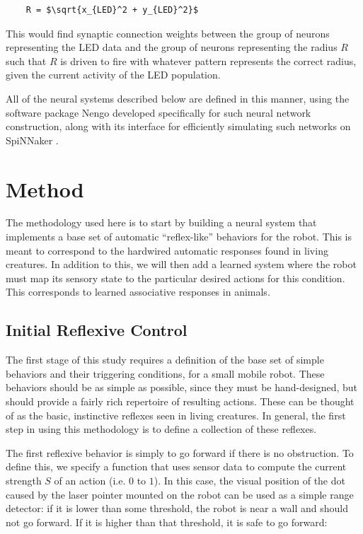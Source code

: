 \documentclass[conference]{IEEEtran}
\begin{document}
\begin{lstlisting}
    R = $\sqrt{x_{LED}^2 + y_{LED}^2}$
\end{lstlisting}

This would find synaptic connection weights between the group of neurons 
representing the LED data and the group of neurons representing the 
radius $R$ such that $R$ is driven to fire with whatever pattern represents 
the correct radius, given the current activity of the LED population. 

All of the neural systems described below are defined in this manner, using
the software package Nengo \cite{bekolay_nengo2014} developed specifically
for such neural network construction, along with its interface
for efficiently simulating such networks on SpiNNaker \cite{mundy2015}.

\section{Method}

The methodology used here is to start by building a neural system that
implements a base set of automatic ``reflex-like'' behaviors for the robot.
This is meant to correspond to the hardwired automatic responses found in
living creatures.  In addition to this, we will then add a learned system
where the robot must map its sensory state to the particular desired actions
for this condition.  This corresponds to learned associative responses
in animals.

\subsection{Initial Reflexive Control}
The first stage of this study requires a definition of the base set of simple 
behaviors and their triggering conditions, for a small mobile robot. These 
behaviors should be as simple as possible, since they must be hand-designed, 
but should provide a fairly rich repertoire of resulting actions. These can be 
thought of as the basic, instinctive reflexes seen in living creatures. In
general, the first step in using this methodology is to define a collection
of these reflexes.

The first reflexive behavior is simply to go forward if there is no 
obstruction. To define this, we specify a function that uses sensor data to 
compute the current strength $S$ of an action (i.e. $0$ to $1$). In this 
case, the visual position of the dot caused by the laser pointer mounted on
the robot can be used as a simple range 
detector: if it is lower than some threshold, the robot is near a wall and 
should not go forward. If it is higher than that threshold, it is safe to 
go forward: 
\end{document}
